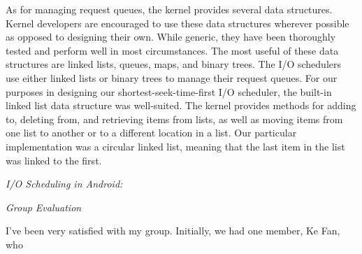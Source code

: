 \documentclass[letterpaper,10pt,titlepage]{article}
\newcommand{\tab}{\hspace*{2em}} %
\begin{document}
\tab As for managing request queues, the kernel provides several data structures. Kernel developers are encouraged to use these data structures wherever possible as opposed to designing their own. While generic, they have been thoroughly tested and perform well in most circumstances. The most useful of these data structures are linked lists, queues, maps, and binary trees. The I/O schedulers use either linked lists or binary trees to manage their request queues. For our purposes in designing our shortest-seek-time-first I/O scheduler, the built-in linked list data structure was well-suited. The kernel provides methods for adding to, deleting from, and retrieving items from lists, as well as moving items from one list to another or to a different location in a list. Our particular implementation was a circular linked list, meaning that the last item in the list was linked to the first.

\tab \emph{I/O Scheduling in Android:} 


\tab \emph{Group Evaluation}

\tab I've been very satisfied with my group. Initially, we had one member, Ke Fan, who 




%
\end{document}

